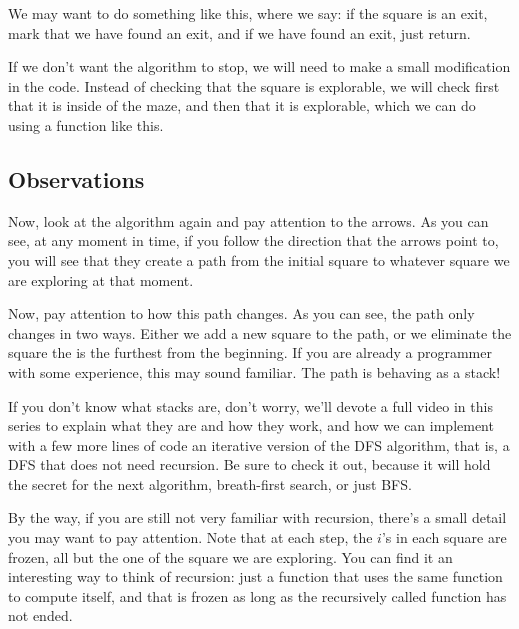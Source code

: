 \documentclass[12pt]{article}
\begin{document}
We may want to do something like this,
where we say: if the square is an exit, mark that we have found
an exit, and if we have found an exit, just return.

If we don't want the algorithm to stop, we will need
to make a small modification in the code. Instead of
checking that the square is explorable,
we will check first that it is inside of the maze,
and then that it is explorable, which we can do using
a function like this.


\subsection{Observations}

Now, look at the algorithm again and pay attention to the arrows. As you can
see, at any moment in time, if you follow the direction that the arrows point to,
you will see that they create a path from the initial square to whatever square
we are exploring at that moment.

Now, pay attention to how this path changes. As you can see, the path only changes
in two ways. Either we add a new square to the path, or we eliminate the square
the is the furthest from the beginning. If you are already a programmer with some
experience, this may sound familiar. The path is behaving as a stack!

If you don't know what stacks are, don't worry, we'll devote a full video in
this series to explain what they are and how they work, and how we can implement 
with a few more lines of code an iterative version of the DFS algorithm,
that is, a DFS that does not
need recursion. Be sure to check it out, because it will hold the secret
for the next algorithm, breath-first search, or just BFS.

By the way, if you are still not very familiar with recursion, there's a small
detail you may want to pay attention. Note that at each step, the $i$'s in each
square are frozen, all but the one of the square we are exploring. You can find it
an interesting way to think of recursion: just a function that uses the same function to compute itself, and that is frozen as long as the recursively called function
has not ended.

\end{document}
